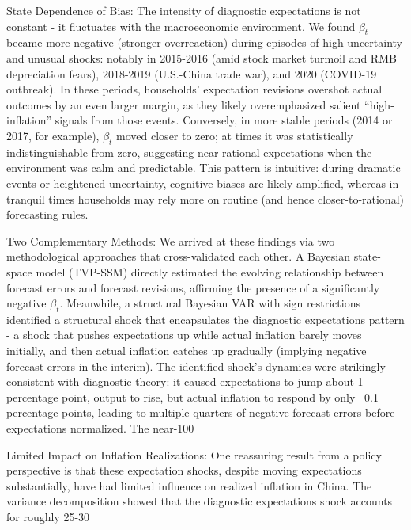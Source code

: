 \documentclass[12pt]{article}
\begin{document}
State Dependence of Bias: The intensity of diagnostic expectations is not constant - it fluctuates with the macroeconomic environment. We found $\beta_t$ became more negative (stronger overreaction) during episodes of high uncertainty and unusual shocks: notably in 2015-2016 (amid stock market turmoil and RMB depreciation fears), 2018-2019 (U.S.-China trade war), and 2020 (COVID-19 outbreak). In these periods, households' expectation revisions overshot actual outcomes by an even larger margin, as they likely overemphasized salient “high-inflation” signals from those events. Conversely, in more stable periods (2014 or 2017, for example), $\beta_t$ moved closer to zero; at times it was statistically indistinguishable from zero, suggesting near-rational expectations when the environment was calm and predictable. This pattern is intuitive: during dramatic events or heightened uncertainty, cognitive biases are likely amplified, whereas in tranquil times households may rely more on routine (and hence closer-to-rational) forecasting rules.

Two Complementary Methods: We arrived at these findings via two methodological approaches that cross-validated each other. A Bayesian state-space model (TVP-SSM) directly estimated the evolving relationship between forecast errors and forecast revisions, affirming the presence of a significantly negative $\beta_t$. Meanwhile, a structural Bayesian VAR with sign restrictions identified a structural shock that encapsulates the diagnostic expectations pattern - a shock that pushes expectations up while actual inflation barely moves initially, and then actual inflation catches up gradually (implying negative forecast errors in the interim). The identified shock's dynamics were strikingly consistent with diagnostic theory: it caused expectations to jump about 1 percentage point, output to rise, but actual inflation to respond by only ~0.1 percentage points, leading to multiple quarters of negative forecast errors before expectations normalized. The near-100%

Limited Impact on Inflation Realizations: One reassuring result from a policy perspective is that these expectation shocks, despite moving expectations substantially, have had limited influence on realized inflation in China. The variance decomposition showed that the diagnostic expectations shock accounts for roughly 25-30%
\end{document}
